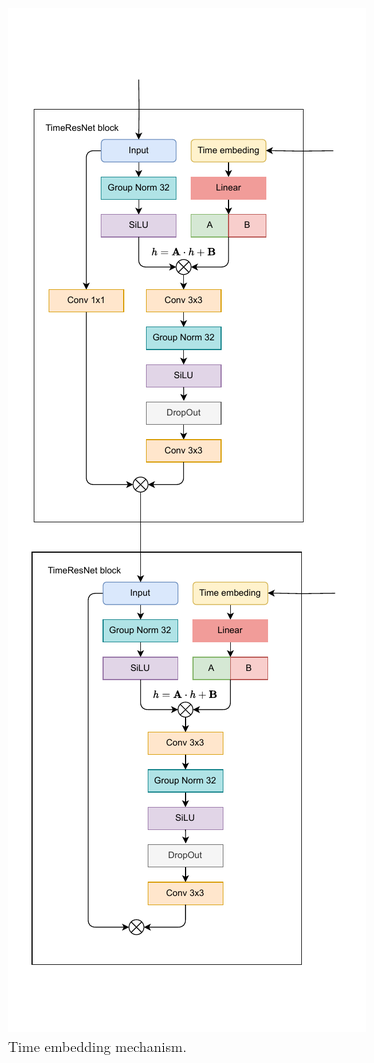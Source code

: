 \documentclass{article}
\begin{document}
\begin{figure}[h!]
  \centering
  \includegraphics[height=0.5\paperheight]{images/Embeding.pdf}
  \caption{Time embedding mechanism.}
\end{figure}
\end{document}

